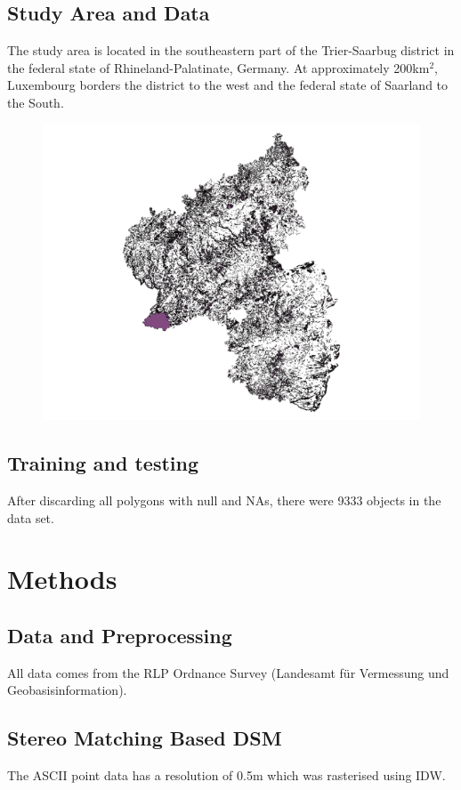 \documentclass[a4paper,12pt]{article}
\begin{document}
\subsection{Study Area and Data}
The study area is located in the southeastern part of the Trier-Saarbug district
in the federal state of Rhineland-Palatinate, Germany. At approximately
200km$^{2}$, Luxembourg borders the district to the west and the federal state of Saarland to the South.
\begin{figure}
	\includegraphics[width=\textwidth]{diagrams/study_area_small.png}
\end{figure}
\subsection{Training and testing}

After discarding all polygons with null and NAs, there were 9333 objects in the
data set.
\section{Methods}
\subsection{Data and Preprocessing}
All data comes from the RLP Ordnance Survey (Landesamt f\"ur Vermessung und
Geobasisinformation).
\subsection{Stereo Matching Based DSM}
The ASCII point data has a resolution of 0.5m which was rasterised using IDW.
\end{document}
